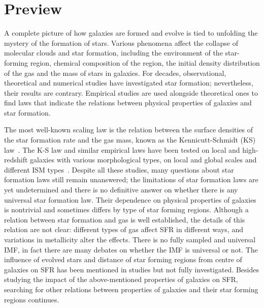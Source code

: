 
\section{Preview}
\label{sec: pre_intro}

A complete picture of how galaxies are formed and evolve is tied to unfolding the mystery of the formation of stars.
 Various phenomena affect the collapse of molecular clouds and star formation, including the environment of the star-forming region, chemical composition of the region, the initial density distribution of the gas and the mass of stars in galaxies.
 For decades, observational, theoretical and numerical studies have investigated star formation; nevertheless, their results are contrary.
 Empirical studies are used alongside theoretical ones to find laws that indicate the relations between physical properties of galaxies and star formation.

The most well-known scaling law is the relation between the surface densities of the star formation rate and the gas mass, known as the Kennicutt-Schmidt (KS) law~\citep{Schmidt59, Kennicutt98a}. 
The K-S law and similar empirical laws have been tested on local and high-redshift galaxies with various morphological types, on local and global scales and different ISM types~\citep[e.g][]{Kennicutt08,Bigiel08,Genzel10,Gnedin10,Shi11}.
Despite all these studies, many questions about star formation laws still remain unanswered; the limitations of star formation laws are yet undetermined and there is no definitive answer on whether there is any universal star formation law.
Their dependence on physical properties of galaxies is nontrivial and sometimes differs by type of star forming regions.
Although a relation between star formation and gas is well established, the details of this relation are not clear:
different types of gas affect SFR in different ways, and variations in metallicity alter the effects.
There is no fully sampled and universal IMF,
in fact there are many debates on whether the IMF is universal or not.
The influence of evolved stars and distance of star forming regions from centre of galaxies on SFR has been mentioned in studies but not fully investigated.
Besides studying the impact of the above-mentioned properties of galaxies on SFR, searching for other relations between properties of galaxies and their star forming regions continues.

